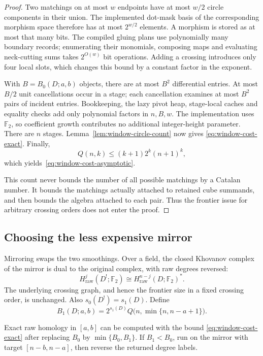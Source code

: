 \begin{proof}
Two matchings on at most $w$ endpoints have at most $w/2$ circle components
in their union.  The implemented dot-mask basis of the corresponding
morphism space therefore has at most $2^{w/2}$ elements.  A morphism is
stored as at most that many bits.  The compiled gluing plans use
polynomially many boundary records; enumerating their monomials, composing
maps and evaluating neck-cutting sums takes $2^{O(w)}$ bit operations.
Adding a crossing introduces only four local slots, which changes this
bound by a constant factor in the exponent.

With $B=B_0(D;a,b)$ objects, there are at most $B^2$ differential entries.
At most $B/2$ unit cancellations occur in a stage; each cancellation
examines at most $B^2$ pairs of incident entries.  Bookkeeping, the lazy
pivot heap, stage-local caches and equality checks add only polynomial
factors in $n,B,w$.  The implementation uses $\mathbb F_2$, so coefficient
growth contributes no additional integer-height parameter.  There are
$n$ stages.  Lemma~\ref{lem:window-circle-count} now gives
\eqref{eq:window-cost-exact}.  Finally,
\[
 Q(n,k)\leq(k+1)2^k(n+1)^k,
\]
which yields~\eqref{eq:window-cost-asymptotic}.

This count never bounds the number of all possible matchings by a Catalan
number.  It bounds the matchings actually attached to retained cube
summands, and then bounds the algebra attached to each pair.  Thus the
frontier issue for arbitrary crossing orders does not enter the proof.
\end{proof}

\subsection{Choosing the less expensive mirror}

Mirroring swaps the two smoothings.  Over a field, the closed Khovanov
complex of the mirror is dual to the original complex, with raw degrees
reversed:
\[
 H^j_{\mathrm{raw}}(D^{!};\mathbb F_2)
 \cong H^{n-j}_{\mathrm{raw}}(D;\mathbb F_2)^*.
\]
The underlying crossing graph, and hence the frontier size in a fixed
crossing order, is unchanged.  Also $s_0(D^{!})=s_1(D)$.  Define
\begin{equation}
 B_1(D;a,b)=2^{s_1(D)}Q\bigl(n,\min\{n,n-a+1\}\bigr).
 \label{eq:mirror-window-bound}
\end{equation}

\begin{corollary}
\label{cor:mirror-window}
Exact raw homology in $[a,b]$ can be computed with the bound
\eqref{eq:window-cost-exact} after replacing $B_0$ by
$\min\{B_0,B_1\}$.  If $B_1<B_0$, run on the mirror with target
$[n-b,n-a]$, then reverse the returned degree labels.
\end{corollary}

